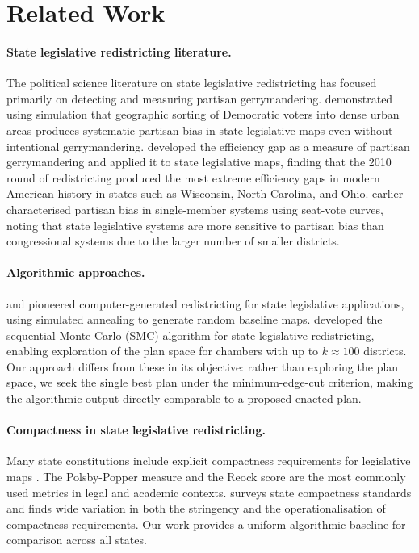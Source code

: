 \section{Related Work}
\label{sec:related}

\paragraph{State legislative redistricting literature.}
The political science literature on state legislative redistricting has focused
primarily on detecting and measuring partisan gerrymandering.
\citet{chen2013unintentional} demonstrated using simulation that geographic
sorting of Democratic voters into dense urban areas produces systematic
partisan bias in state legislative maps even without intentional gerrymandering.
\citet{stephanopoulos2015partisan} developed the efficiency gap as a measure
of partisan gerrymandering and applied it to state legislative maps, finding
that the 2010 round of redistricting produced the most extreme efficiency gaps
in modern American history in states such as Wisconsin, North Carolina, and Ohio.
\citet{mcghee2014measuring} earlier characterised partisan bias in
single-member systems using seat-vote curves, noting that state legislative
systems are more sensitive to partisan bias than congressional systems due to
the larger number of smaller districts.

\paragraph{Algorithmic approaches.}
\citet{cirincione2000assessing} and \citet{altman2011bard} pioneered
computer-generated redistricting for state legislative applications,
using simulated annealing to generate random baseline maps.
\citet{fifield2020automated} developed the sequential Monte Carlo (SMC)
algorithm for state legislative redistricting, enabling exploration of
the plan space for chambers with up to $k \approx 100$ districts.
Our approach differs from these in its objective: rather than exploring
the plan space, we seek the single best plan under the minimum-edge-cut
criterion, making the algorithmic output directly comparable to a
proposed enacted plan.

\paragraph{Compactness in state legislative redistricting.}
Many state constitutions include explicit compactness requirements for
legislative maps \citep{monmonier2001bushmanders}. The Polsby-Popper
measure \citep{polsby1991third} and the Reock score \citep{reock1961note}
are the most commonly used metrics in legal and academic contexts.
\citet{kaufman2020state} surveys state compactness standards and finds
wide variation in both the stringency and the operationalisation of
compactness requirements. Our work provides a uniform algorithmic baseline
for comparison across all states.

